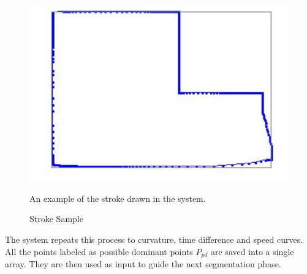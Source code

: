 \documentclass[a4paper,10pt]{IEEEconf}
\begin{document}
\begin{figure}[]
	\centering
		\includegraphics[scale=0.5]{images/orignalStroke.pdf}
	\caption{Stroke Sample} An example of the stroke drawn in the system.
	\label{fig:orignalStroke}
\end{figure}
The system repeats this process to curvature, time difference and speed curves. All the points labeled as possible dominant points $P_{pd}$ are saved into a single array. They are then used as input to guide the next segmentation phase. 
\end{document}
